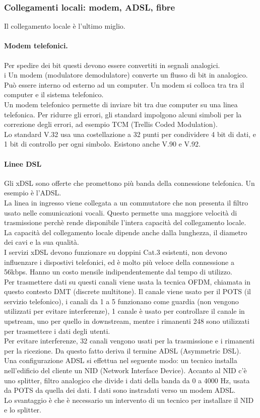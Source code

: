 \documentclass{article}
\begin{document}
		\subsubsection{Collegamenti locali: modem, ADSL, fibre}
		Il collegamento locale è l'ultimo miglio.
		\paragraph{Modem telefonici.} Per spedire dei bit questi devono essere convertiti in segnali analogici. \\ i
		Un modem (modulatore demodulatore) converte un flusso di bit in analogico. Può essere interno od esterno ad un computer. Un modem si colloca tra tra il computer e il sistema telefonico. \\ 
		Un modem telefonico permette di inviare bit tra due computer su una linea telefonica. Per ridurre gli errori, gli standard impolgono alcuni simboli per la correzione degli errori, ad esempio TCM (Trellis Coded Modulation).\\
		Lo standard V.32 usa una costellazione a 32 punti per condividere 4 bit di dati, e 1 bit di controllo per ogni simbolo. Esistono anche V.90 e V.92.
		\paragraph{Linee DSL} Gli xDSL sono offerte che promettono più banda della connessione telefonica. Un esempio è l'ADSL.\\
		La linea in ingresso viene collegata a un commutatore che non presenta il filtro usato nelle comunicazioni vocali. Questo permette una maggiore velocità di trasmissione perchè rende disponibile l'intera capacità del collegamento locale. \\
		La capacità del collegamento locale dipende anche dalla lunghezza, il diametro dei cavi e la sua qualità.\\ 
		I servizi xDSL devono funzionare su doppini Cat.3 esistenti, non devono influenzare i dispostivi telefonici, ed è molto più veloce della connessione a 56kbps. Hanno un costo mensile indipendentemente dal tempo di utilizzo. \\
		Per trasmettere dati su questi canali viene usata la tecnica OFDM, chiamata in questo contesto DMT (discrete multitone). Il canale viene usato per il POTS (il servizio telefonico), i canali da 1 a 5 funzionano come guardia (non vengono utilizzati per evitare interferenze), 1 canale è usato per controllare il canale in upstream, uno per quello in downstream, mentre i rimanenti 248 sono utilizzati per trasmettere i dati degli utenti.\\
		Per evitare interferenze, 32 canali vengono usati per la trasmissione e i rimanenti per la ricezione. Da questo fatto deriva il termine ADSL (Asymmetric DSL).\\
		Una configurazione ADSL si effettua nel seguente modo: un tecnico installa nell'edificio del cliente un NID (Network Interface Device). Accanto al NID c'è uno splitter, filtro analogico che divide i dati della banda da 0 a 4000 Hz, usata da POTS da quella dei dati. I dati sono instradati verso un modem ADSL. \\
		Lo svantaggio è che è necessario un intervento di un tecnico per installare il NID e lo splitter. 
\end{document}
